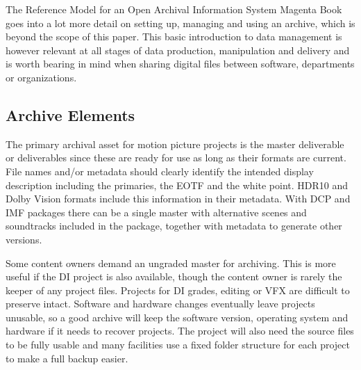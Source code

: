 The Reference Model for an Open Archival Information System Magenta Book goes into a lot more detail on setting up, managing and using an archive, which is beyond the scope of this paper. This basic introduction to data management is however relevant at all stages of data production, manipulation and delivery and is worth bearing in mind when sharing digital files between software, departments or organizations.

\subsection{Archive Elements}

The primary archival asset for motion picture projects is the master deliverable or deliverables since these are ready for use as long as their formats are current. File names and/or metadata should clearly identify the intended display description including the primaries, the EOTF and the white point. HDR10 and Dolby Vision formats include this information in their metadata. With DCP and IMF packages there can be a single master with alternative scenes and soundtracks included in the package, together with metadata to generate other versions. 

Some content owners demand an ungraded master for archiving. This is more useful if the DI project is also available, though the content owner is rarely the keeper of any project files. Projects for DI grades, editing or VFX are difficult to preserve intact. Software and hardware changes eventually  leave projects unusable, so a good archive will keep the software version, operating system and hardware if it needs to recover projects. The project will also need the source files to be fully usable and many facilities use a fixed folder structure for each project to make a full backup easier.
